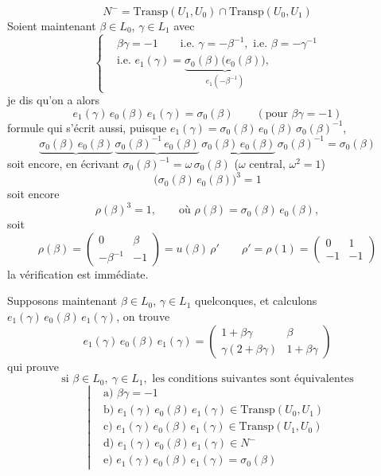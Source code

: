 \documentclass[11pt,a4paper]{article}
\begin{document}
\[
N^- = \mathrm{Transp}(U_1, U_0) \cap \mathrm{Transp}(U_0, U_1) \tag{30}
\]
Soient maintenant $\beta \in L_0$, $\gamma \in L_1$ avec
\[
\left\{
\begin{aligned}
&\beta\gamma = -1 \qquad \text{i.e. } \gamma = -\beta^{-1}, \text{ i.e. } \beta = -\gamma^{-1} \\
&\text{i.e. } e_1(\gamma) = \underbrace{\sigma_0(\beta)\bigl(e_0(\beta)\bigr)}_{e_1(-\beta^{-1})} ,
\end{aligned}
\right. \tag{31}
\]
je dis qu'on a alors
\[
e_1(\gamma)\, e_0(\beta)\, e_1(\gamma) = \sigma_0(\beta) \qquad (\text{pour } \beta\gamma = -1) \tag{32}
\]
formule qui s'écrit aussi, puisque $e_1(\gamma) = \sigma_0(\beta)\, e_0(\beta)\, \sigma_0(\beta)^{-1}$,
\[
\underbrace{\sigma_0(\beta)\, e_0(\beta)}\, \underbrace{\sigma_0(\beta)^{-1}\, e_0(\beta)}\, \underbrace{\sigma_0(\beta)\, e_0(\beta)}\, \sigma_0(\beta)^{-1} = \sigma_0(\beta)
\]
soit encore, en écrivant $\sigma_0(\beta)^{-1} = \omega\, \sigma_0(\beta)$ ($\omega$ central, $\omega^2 = 1$)
\[
\bigl(\sigma_0(\beta)\, e_0(\beta)\bigr)^3 = 1
\]
soit encore
\[
\rho(\beta)^3 = 1, \qquad \text{où } \rho(\beta) = \sigma_0(\beta)\, e_0(\beta), \tag{33}
\]
soit
\[
\rho(\beta) = \begin{pmatrix} 0 & \beta \\ -\beta^{-1} & -1 \end{pmatrix} = u(\beta)\, \rho' \qquad \rho' = \rho(1) = \begin{pmatrix} 0 & 1 \\ -1 & -1 \end{pmatrix} \tag{34}
\]
la vérification est immédiate.

Supposons maintenant $\beta \in L_0$, $\gamma \in L_1$ quelconques, et calculons $e_1(\gamma)\, e_0(\beta)\, e_1(\gamma)$, on trouve
\[
e_1(\gamma)\, e_0(\beta)\, e_1(\gamma) = \begin{pmatrix} 1 + \beta\gamma & \beta \\ \gamma(2 + \beta\gamma) & 1 + \beta\gamma \end{pmatrix} \tag{35}
\]
qui prouve
\[
\text{si } \beta \in L_0,\ \gamma \in L_1, \text{ les conditions suivantes sont équivalentes} \tag{37}
\]
\[
\left|
\begin{aligned}
&\text{a) } \beta\gamma = -1 \\
&\text{b) } e_1(\gamma)\, e_0(\beta)\, e_1(\gamma) \in \mathrm{Transp}(U_0, U_1) \\
&\text{c) } e_1(\gamma)\, e_0(\beta)\, e_1(\gamma) \in \mathrm{Transp}(U_1, U_0) \\
&\text{d) } e_1(\gamma)\, e_0(\beta)\, e_1(\gamma) \in N^- \\
&\text{e) } e_1(\gamma)\, e_0(\beta)\, e_1(\gamma) = \sigma_0(\beta)
\end{aligned}
\right.
\]
\end{document}
